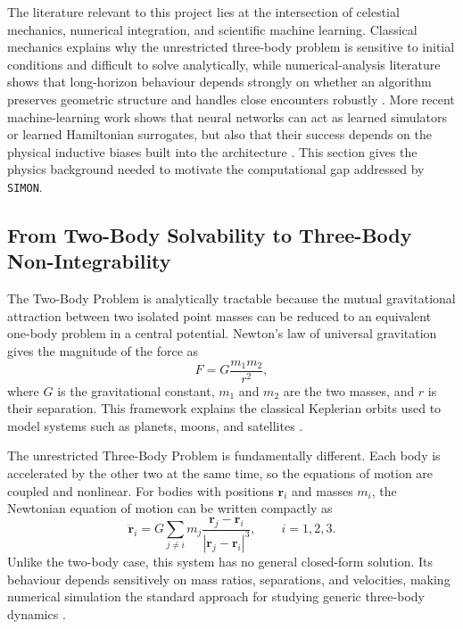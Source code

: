 \documentclass[12pt]{article}
\begin{document}
The literature relevant to this project lies at the intersection of celestial mechanics,
numerical integration, and scientific machine learning. Classical mechanics explains why
the unrestricted three-body problem is sensitive to initial conditions and difficult to solve
analytically, while numerical-analysis literature shows that long-horizon behaviour depends
strongly on whether an algorithm preserves geometric structure and handles close encounters
robustly \cite{hairer2006geometric,Rein_2015,Rein_2014,boekholt2015reliability}. More recent
machine-learning work shows that neural networks can act as learned simulators or learned
Hamiltonian surrogates, but also that their success depends on the physical inductive biases
built into the architecture \cite{chen2018neuralode,battaglia2016interaction,greydanus2019hamiltonian,gruver2022deconstructing,horn2025generalized}. This section gives the physics background needed to motivate the computational gap addressed by \texttt{SIMON}.

\subsection{From Two-Body Solvability to Three-Body Non-Integrability}

The Two-Body Problem is analytically tractable because the mutual gravitational attraction
between two isolated point masses can be reduced to an equivalent one-body problem in a
central potential. Newton's law of universal gravitation gives the magnitude of the force as
\begin{equation}
F = G\frac{m_1m_2}{r^2},
\end{equation}
where $G$ is the gravitational constant, $m_1$ and $m_2$ are the two masses, and $r$ is their
separation. This framework explains the classical Keplerian orbits used to model systems
such as planets, moons, and satellites \cite{murray1999solar}.

The unrestricted Three-Body Problem is fundamentally different. Each body is accelerated
by the other two at the same time, so the equations of motion are coupled and nonlinear.
For bodies with positions $\mathbf r_i$ and masses $m_i$, the Newtonian equation of motion
can be written compactly as
\begin{equation}
\ddot{\mathbf r}_i =
G\sum_{j\ne i} m_j
\frac{\mathbf r_j-\mathbf r_i}{|\mathbf r_j-\mathbf r_i|^3},
\qquad i=1,2,3.
\end{equation}
Unlike the two-body case, this system has no general closed-form solution. Its behaviour
depends sensitively on mass ratios, separations, and velocities, making numerical simulation
the standard approach for studying generic three-body dynamics \cite{murray1999solar}.
\end{document}
